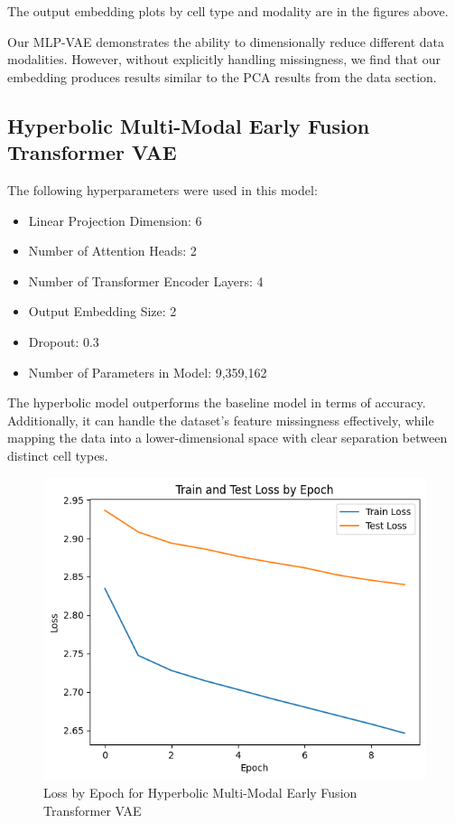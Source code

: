 \documentclass[11pt,a4paper]{article}
\begin{document}
The output embedding plots by cell type and modality are in the figures above.

Our MLP-VAE demonstrates the ability to dimensionally reduce different data modalities. However, without explicitly handling missingness, we find that our embedding produces results similar to the PCA results from the data section.

\subsection{Hyperbolic Multi-Modal Early Fusion Transformer VAE }

The following hyperparameters were used in this model:
 \begin{itemize}
     \item Linear Projection Dimension: 6
     \item Number of Attention Heads: 2
     \item Number of Transformer Encoder Layers: 4
     \item Output Embedding Size: 2
     \item Dropout: 0.3
     \item Number of Parameters in Model: 9,359,162
 \end{itemize}

The hyperbolic model outperforms the baseline model in terms of accuracy. Additionally, it can handle the dataset's feature missingness effectively, while mapping the data into a lower-dimensional space with clear separation between distinct cell types.
\begin{figure}[H]
    \centering
    \includegraphics[width=0.5\linewidth]{hyperbolic_loss.png}
    \caption{Loss by Epoch for Hyperbolic Multi-Modal Early Fusion Transformer VAE}
    \label{fig:enter-label}
\end{figure}
\end{document}
